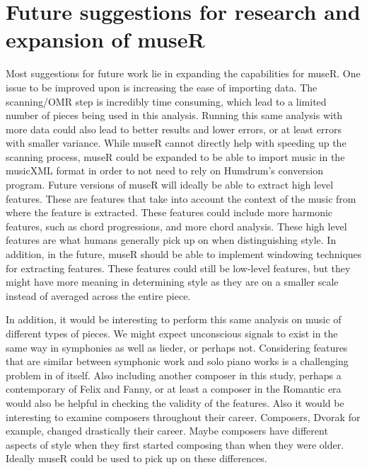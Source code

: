 \documentclass[12pt,twoside]{reedthesis}
\theoremstyle{definition}
\theoremstyle{definition}
\theoremstyle{definition}
\theoremstyle{remark}
\begin{document}
\section{Future suggestions for research and expansion of
museR}\label{future-suggestions-for-research-and-expansion-of-muser}

Most suggestions for future work lie in expanding the capabilities for
museR. One issue to be improved upon is increasing the ease of importing
data. The scanning/OMR step is incredibly time consuming, which lead to
a limited number of pieces being used in this analysis. Running this
same analysis with more data could also lead to better results and lower
errors, or at least errors with smaller variance. While museR cannot
directly help with speeding up the scanning process, museR could be
expanded to be able to import music in the musicXML format in order to
not need to rely on Humdrum's conversion program. Future versions of
museR will ideally be able to extract high level features. These are
features that take into account the context of the music from where the
feature is extracted. These features could include more harmonic
features, such as chord progressions, and more chord analysis. These
high level features are what humans generally pick up on when
distinguishing style. In addition, in the future, museR should be able
to implement windowing techniques for extracting features. These
features could still be low-level features, but they might have more
meaning in determining style as they are on a smaller scale instead of
averaged across the entire piece.

In addition, it would be interesting to perform this same analysis on
music of different types of pieces. We might expect unconscious signals
to exist in the same way in symphonies as well as lieder, or perhaps
not. Considering features that are similar between symphonic work and
solo piano works is a challenging problem in of itself. Also including
another composer in this study, perhaps a contemporary of Felix and
Fanny, or at least a composer in the Romantic era would also be helpful
in checking the validity of the features. Also it would be interesting
to examine composers throughout their career. Composers, Dvorak for
example, changed drastically their career. Maybe composers have
different aspects of style when they first started composing than when
they were older. Ideally museR could be used to pick up on these
differences.

\appendix

\backmatter
\end{document}
